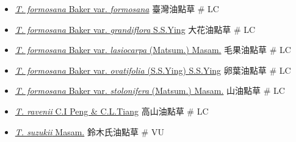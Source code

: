 \begin{itemize}
  \begin{itemize}
        \item[] \href{http://www.theplantlist.org/tpl1.1/search?q=Tricyrtis+formosana+var.+formosana}{\textit{T. formosana} Baker var. \textit{formosana}}   臺灣油點草  \# LC
        \item[] \href{http://www.theplantlist.org/tpl1.1/search?q=Tricyrtis+formosana+var.+grandiflora}{\textit{T. formosana} Baker var. \textit{grandiflora} S.S.Ying}   大花油點草  \# LC
        \item[] \href{http://www.theplantlist.org/tpl1.1/search?q=Tricyrtis+formosana+var.+lasiocarpa}{\textit{T. formosana} Baker var. \textit{lasiocarpa} (Matsum.) Masam.}   毛果油點草  \# LC
        \item[] \href{http://www.theplantlist.org/tpl1.1/search?q=Tricyrtis+formosana+var.+ovatifolia}{\textit{T. formosana} Baker var. \textit{ovatifolia} (S.S.Ying) S.S.Ying}   卵葉油點草  \# LC
        \item[] \href{http://www.theplantlist.org/tpl1.1/search?q=Tricyrtis+formosana+var.+stolonifera}{\textit{T. formosana} Baker var. \textit{stolonifera} (Matsum.) Masam.}   山油點草  \# LC
        \item[] \href{http://www.theplantlist.org/tpl1.1/search?q=Tricyrtis+ravenii}{\textit{T. ravenii} C.I Peng \& C.L.Tiang}   高山油點草  \# LC
        \item[] \href{http://www.theplantlist.org/tpl1.1/search?q=Tricyrtis+suzukii}{\textit{T. suzukii} Masam.}   鈴木氏油點草  \# VU
  \end{itemize}
  \end{itemize}
